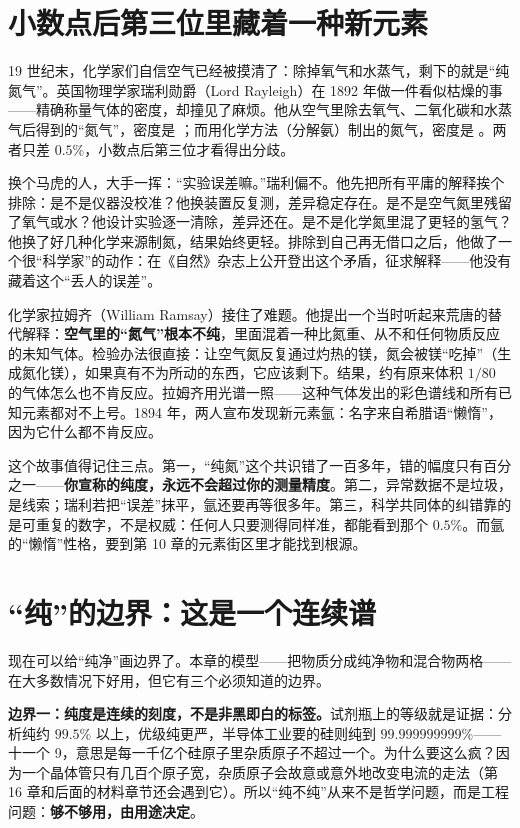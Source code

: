 \section{小数点后第三位里藏着一种新元素}

\begin{zhengju}
19 世纪末，化学家们自信空气已经被摸清了：除掉氧气和水蒸气，剩下的就是“纯氮气”。英国物理学家瑞利勋爵（Lord Rayleigh）在 1892 年做一件看似枯燥的事——精确称量气体的密度，却撞见了麻烦。他从空气里除去氧气、二氧化碳和水蒸气后得到的“氮气”，密度是 ；而用化学方法（分解氨）制出的氮气，密度是 。两者只差 $0.5\%$，小数点后第三位才看得出分歧。

换个马虎的人，大手一挥：“实验误差嘛。”瑞利偏不。他先把所有平庸的解释挨个排除：是不是仪器没校准？他换装置反复测，差异稳定存在。是不是空气氮里残留了氧气或水？他设计实验逐一清除，差异还在。是不是化学氮里混了更轻的氢气？他换了好几种化学来源制氮，结果始终更轻。排除到自己再无借口之后，他做了一个很“科学家”的动作：在《自然》杂志上公开登出这个矛盾，征求解释——他没有藏着这个“丢人的误差”。

化学家拉姆齐（William Ramsay）接住了难题。他提出一个当时听起来荒唐的替代解释：\textbf{空气里的“氮气”根本不纯}，里面混着一种比氮重、从不和任何物质反应的未知气体。检验办法很直接：让空气氮反复通过灼热的镁，氮会被镁“吃掉”（生成氮化镁），如果真有不为所动的东西，它应该剩下。结果，约有原来体积 $1/80$ 的气体怎么也不肯反应。拉姆齐用光谱一照——这种气体发出的彩色谱线和所有已知元素都对不上号。1894 年，两人宣布发现新元素氩：名字来自希腊语“懒惰”，因为它什么都不肯反应。

这个故事值得记住三点。第一，“纯氮”这个共识错了一百多年，错的幅度只有百分之一——\textbf{你宣称的纯度，永远不会超过你的测量精度}。第二，异常数据不是垃圾，是线索；瑞利若把“误差”抹平，氩还要再等很多年。第三，科学共同体的纠错靠的是可重复的数字，不是权威：任何人只要测得同样准，都能看到那个 $0.5\%$。而氩的“懒惰”性格，要到第 10 章的元素街区里才能找到根源。
\end{zhengju}

\section{“纯”的边界：这是一个连续谱}

现在可以给“纯净”画边界了。本章的模型——把物质分成纯净物和混合物两格——在大多数情况下好用，但它有三个必须知道的边界。

\textbf{边界一：纯度是连续的刻度，不是非黑即白的标签。}试剂瓶上的等级就是证据：分析纯约 $99.5\%$ 以上，优级纯更严，半导体工业要的硅则纯到 $99.999999999\%$——十一个 9，意思是每一千亿个硅原子里杂质原子不超过一个。为什么要这么疯？因为一个晶体管只有几百个原子宽，杂质原子会故意或意外地改变电流的走法（第 16 章和后面的材料章节还会遇到它）。所以“纯不纯”从来不是哲学问题，而是工程问题：\textbf{够不够用，由用途决定}。

